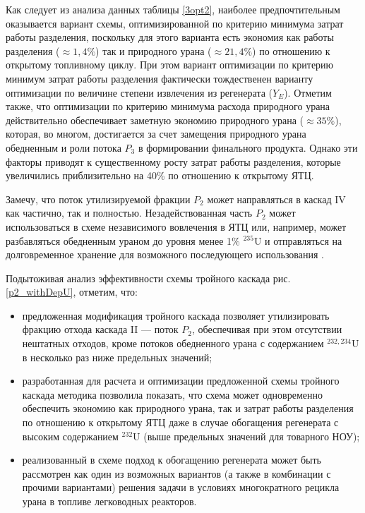 Как следует из анализа данных таблицы \ref{3opt2}, наиболее предпочтительным оказывается вариант схемы, оптимизированной по критерию минимума затрат работы разделения, поскольку для этого варианта есть экономия как работы разделения ($\approx 1,4\%$) так и природного урана ($\approx 21,4\%$) по отношению к открытому топливному циклу. При этом вариант оптимизации по критерию минимум затрат работы разделения фактически тождественен варианту оптимизации по величине степени извлечения из регенерата ($Y_E$). Отметим также, что оптимизации по критерию минимума расхода природного урана действительно обеспечивает заметную экономию природного урана ($\approx 35\%$), которая, во многом, достигается за счет замещения природного урана обедненным и роли потока $P_3$ в формировании финального продукта. Однако эти факторы приводят к существенному росту затрат работы разделения, которые увеличились приблизительно на 40\% по отношению к открытому ЯТЦ.

Замечу, что поток утилизируемой фракции $P_2$ может направляться в каскад IV как частично, так и полностью. Незадействованная часть $P_2$ может использоваться в схеме независимого вовлечения в ЯТЦ или, например, может разбавляться обедненным ураном до уровня менее 1\% $^{235}$U и отправляться на долговременное хранение для возможного последующего использования \cite{EXTvodolazskihSposobIzotopnogoVosstanovleniya}.

Подытоживая анализ эффективности схемы тройного каскада рис. \ref{p2_withDepU}, отметим, что:

\begin{itemize}
    \item предложенная модификация тройного каскада позволяет утилизировать фракцию отхода каскада II --- поток $P_2$, обеспечивая при этом отсутствии нештатных отходов, кроме потоков обедненного урана с содержанием $^{232,234}$U в несколько раз ниже предельных значений; 
    \item разработанная для расчета и оптимизации предложенной схемы тройного каскада методика позволила показать, что схема может одновременно обеспечить экономию как природного урана, так и затрат работы разделения по отношению к открытому ЯТЦ даже в случае обогащения регенерата с высоким содержанием $^{232}$U (выше предельных значений для товарного НОУ); 
    \item реализованный в схеме подход к обогащению регенерата может быть рассмотрен как один из возможных вариантов (а также в комбинации с прочими вариантами) решения задачи в условиях многократного рецикла урана в топливе легководных реакторов.
\end{itemize}

